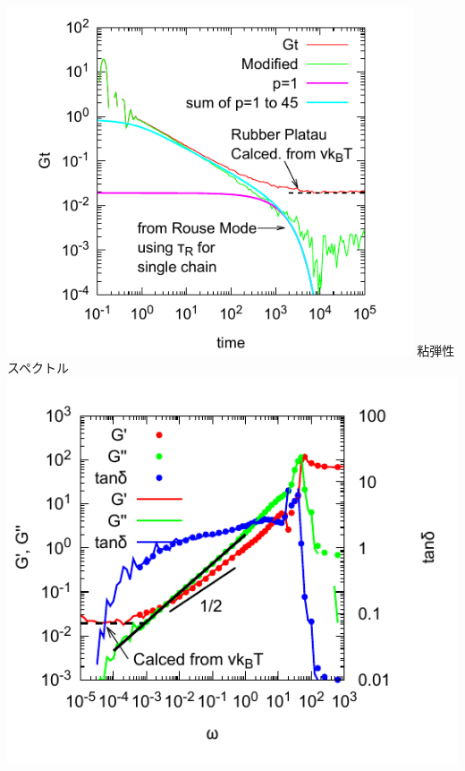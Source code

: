 \documentclass[12pt, dvipdfmx]{beamer}
\begin{document}
\begin{frame}
\begin{columns}[totalwidth=1\textwidth]
				\includegraphics[width=0.9\textwidth]{Gt_loglog.pdf}
				\scriptsize
				粘弾性スペクトル
				\includegraphics[width=\textwidth]{N_44_Freq_Sweep.pdf}
		\end{columns}
\end{frame}
\end{document}
